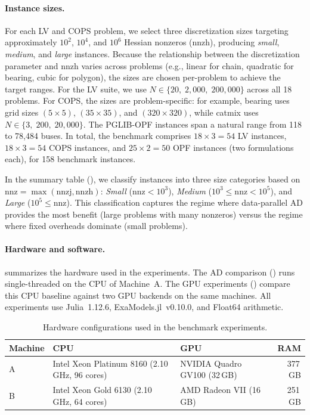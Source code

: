 \documentclass[11pt]{article}
\begin{document}
\paragraph{Instance sizes.}
For each LV and COPS problem, we select three discretization sizes targeting approximately $10^2$, $10^4$, and $10^6$ Hessian nonzeros (nnzh), producing \emph{small}, \emph{medium}, and \emph{large} instances. Because the relationship between the discretization parameter and nnzh varies across problems (e.g., linear for chain, quadratic for bearing, cubic for polygon), the sizes are chosen per-problem to achieve the target ranges. For the LV suite, we use $N \in \{20,\; 2{,}000,\; 200{,}000\}$ across all 18 problems. For COPS, the sizes are problem-specific: for example, bearing uses grid sizes $(5\times 5)$, $(35 \times 35)$, and $(320 \times 320)$, while catmix uses $N \in \{3,\; 200,\; 20{,}000\}$. The PGLIB-OPF instances span a natural range from 118 to 78{,}484 buses. In total, the benchmark comprises $18 \times 3 = 54$ LV instances, $18 \times 3 = 54$ COPS instances, and $25 \times 2 = 50$ OPF instances (two formulations each), for 158 benchmark instances.

In the summary table (), we classify instances into three size categories based on $\text{nnz} = \max(\text{nnzj}, \text{nnzh})$: \emph{Small} ($\text{nnz} < 10^3$), \emph{Medium} ($10^3 \leq \text{nnz} < 10^5$), and \emph{Large} ($10^5 \leq \text{nnz}$). This classification captures the regime where data-parallel AD provides the most benefit (large problems with many nonzeros) versus the regime where fixed overheads dominate (small problems).

\paragraph{Hardware and software.}
 summarizes the hardware used in the experiments. The AD comparison () runs single-threaded on the CPU of Machine~A. The GPU experiments () compare this CPU baseline against two GPU backends on the same machines. All experiments use Julia~1.12.6, ExaModels.jl~v0.10.0, and Float64 arithmetic.

\begin{table}[t]
\centering
\caption{Hardware configurations used in the benchmark experiments.}
\label{tab:hardware}
\begin{tabular}{lllr}
  \toprule
  Machine & CPU & GPU & RAM \\
  \midrule
  A & Intel Xeon Platinum 8160 (2.10\,GHz, 96 cores) & NVIDIA Quadro GV100 (32\,GB) & 377\,GB \\
  B & Intel Xeon Gold 6130 (2.10\,GHz, 64 cores) & AMD Radeon VII (16\,GB) & 251\,GB \\
  \bottomrule
\end{tabular}
\end{table}
\end{document}
